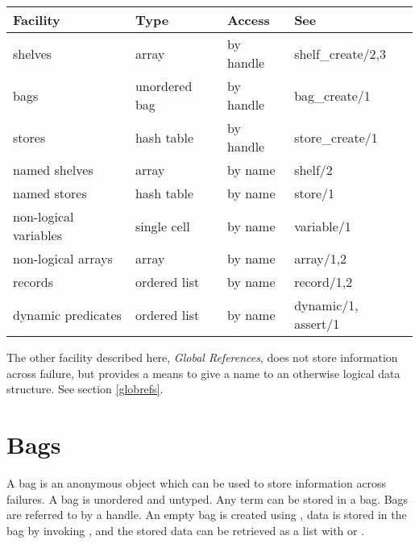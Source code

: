 \vspace{2mm}
\begin{center}
\begin{tabular}{l|l l l}
Facility & Type & Access & See \\
\hline
shelves&                array&          by handle&      shelf_create/2,3 \\
bags&                   unordered bag&  by handle&      bag_create/1 \\
stores&                 hash table&     by handle&      store_create/1 \\
named shelves&          array&          by name&        shelf/2 \\
named stores&           hash table&     by name&        store/1 \\
non-logical variables&  single cell&    by name&        variable/1 \\
non-logical arrays&     array&          by name&        array/1,2 \\
records&                ordered list&   by name&        record/1,2 \\
dynamic predicates&     ordered list&   by name&        dynamic/1, assert/1 \\
\end{tabular}
\end{center}
\vspace{2mm}

The other facility described here, \emph{Global References}, does not store
information across failure, but provides a means to give a name to
an otherwise logical data structure. See section \ref{globrefs}.


\section{Bags}

A bag is an anonymous object which can be used to store
information across failures.
A bag is unordered and untyped. Any {\eclipse} term can be stored in a bag.
Bags are referred to by a handle.
An empty bag is created using
,
data is stored in the bag by invoking
,
and the stored data can be retrieved as a list with
 or
.

